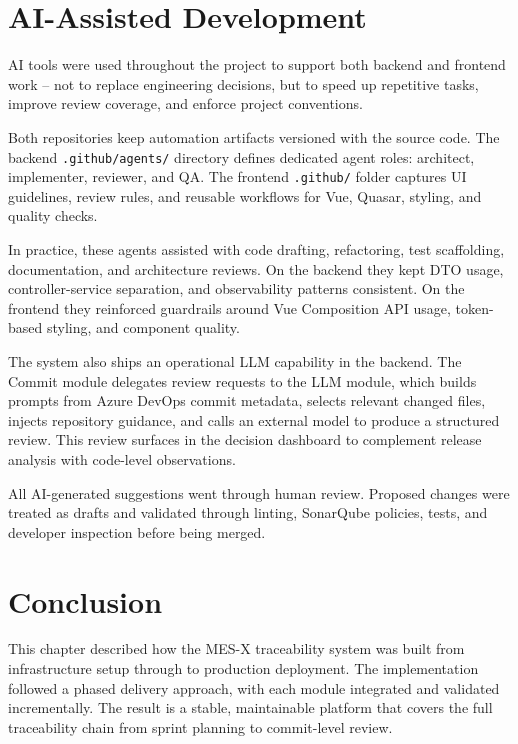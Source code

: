 \section{AI-Assisted Development}

AI tools were used throughout the project to support both backend and frontend
work -- not to replace engineering decisions, but to speed up repetitive tasks,
improve review coverage, and enforce project conventions.

Both repositories keep automation artifacts versioned with the source code. The
backend \texttt{.github/agents/} directory defines dedicated agent roles:
architect, implementer, reviewer, and QA. The frontend \texttt{.github/}
folder captures UI guidelines, review rules, and reusable workflows for Vue,
Quasar, styling, and quality checks.

In practice, these agents assisted with code drafting, refactoring, test
scaffolding, documentation, and architecture reviews. On the backend they kept
DTO usage, controller-service separation, and observability patterns consistent.
On the frontend they reinforced guardrails around Vue Composition API usage,
token-based styling, and component quality.

The system also ships an operational LLM capability in the backend. The Commit
module delegates review requests to the LLM module, which builds prompts from
Azure DevOps commit metadata, selects relevant changed files, injects
repository guidance, and calls an external model to produce a structured review.
This review surfaces in the decision dashboard to complement release analysis
with code-level observations.

All AI-generated suggestions went through human review. Proposed changes were
treated as drafts and validated through linting, SonarQube policies, tests, and
developer inspection before being merged.

\section{Conclusion}

This chapter described how the MES-X traceability system was built from
infrastructure setup through to production deployment. The implementation
followed a phased delivery approach, with each module integrated and validated
incrementally. The result is a stable, maintainable platform that covers the
full traceability chain from sprint planning to commit-level review.